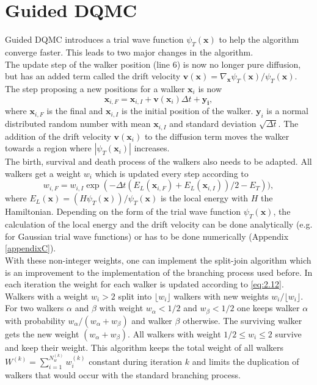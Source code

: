 \documentclass [12pt]{report}
\begin{document}
\section{Guided DQMC}
Guided DQMC introduces a trial wave function $\psi_T(\bm{x})$ to help the algorithm converge faster. This leads to two major changes in the algorithm. \cite{cyrus} \\
The update step of the walker position (line 6) is now no longer pure diffusion, but has an added term called the drift velocity $\bm{v}(\bm{x}) = \nabla_{\bm{x}} \psi_T(\bm{x})/ \psi_T(\bm{x})$. The step proposing a new positions for a walker $\bm{x}_i$ is now 
\begin{equation}\label{eq:2.11} 
\bm{x}_{i,F} = \bm{x}_{i,I} + \bm{v}(\bm{x}_i)\Delta t + \bm{y_i},
\end{equation}
where $\bm{x}_{i,F}$ is the final and $\bm{x}_{i,I}$ is the initial position of the walker. $\bm{y}_i$ is a normal distributed random number with mean $\bm{x}_{i,I}$ and standard deviation $\sqrt{\Delta t}$. The addition of the drift velocity $\bm{v}(\bm{x}_i)$ to the diffusion term moves the walker towards a region where $|\psi_T(\bm{x}_i)|$ increases.\\
The birth, survival and death process of the walkers also needs to be adapted. All walkers get a weight $w_i$ which is updated every step according to
\begin{equation}\label{eq:2.12} 
w_{i,F} = w_{i,I} \exp{(-\Delta t(E_L(\bm{x}_{i,F}) + E_L(\bm{x}_{i,I}))/2 - E_T))},
\end{equation}
where $E_L(\bm{x}) = (H\psi_T(\bm{x}))/\psi_T(\bm{x})$ is the local energy with $H$ the Hamiltonian. Depending on the form of the trial wave function $\psi_T(\bm{x})$, the calculation of the local energy and the drift velocity can be done analytically (e.g. for Gaussian trial wave functions) or has to be done numerically (Appendix \ref{appendixC}). \\
With these non-integer weights, one can implement the split-join algorithm \cite{split_join} which is an improvement to the implementation of the branching process used before. In each iteration the weight for each walker is updated according to \eqref{eq:2.12}. Walkers with a weight $w_i > 2$ split into $\lfloor w_i \rfloor$ walkers with new weights $w_i/\lfloor w_i \rfloor$. For two walkers $\alpha$ and $\beta$ with weight $w_\alpha < 1/2$ and $w_\beta < 1/2$ one keeps walker $\alpha$  with probability $w_\alpha/(w_\alpha + w_\beta)$ and walker $\beta$ otherwise. The surviving walker gets the new weight $(w_\alpha + w_\beta)$. All walkers with weight $1/2 \leq w_i \leq 2$ survive and keep their weight. This algorithm keeps the total weight of all walkers $W^{(k)} =  \sum_{i = 1}^{N_w^{(k)}} w_i^{(k)}$ constant during iteration $k$ and limits the duplication of walkers that would occur with the standard branching process.\\
\end{document}

